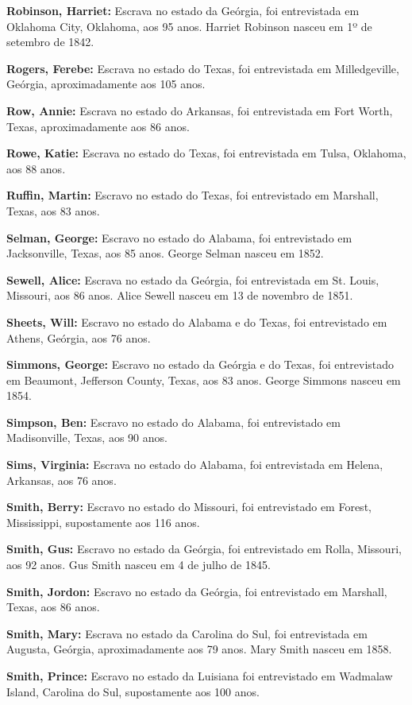 \textbf{Robinson, Harriet:} Escrava no estado da Geórgia, foi
entrevistada em Oklahoma City, Oklahoma, aos 95 anos. Harriet Robinson
nasceu em 1º de setembro de 1842.

\textbf{Rogers, Ferebe:} Escrava no estado do Texas, foi entrevistada em
Milledgeville, Geórgia, aproximadamente aos 105 anos.

\textbf{Row, Annie:} Escrava no estado do Arkansas, foi entrevistada em
Fort Worth, Texas, aproximadamente aos 86 anos.

\textbf{Rowe, Katie:} Escrava no estado do Texas, foi entrevistada em
Tulsa, Oklahoma, aos 88 anos.

\textbf{Ruffin, Martin:} Escravo no estado do Texas, foi entrevistado em
Marshall, Texas, aos 83 anos.

\textbf{Selman, George:} Escravo no estado do Alabama, foi entrevistado
em Jacksonville, Texas, aos 85 anos. George Selman nasceu em 1852.

\textbf{Sewell, Alice:} Escrava no estado da Geórgia, foi entrevistada
em St. Louis, Missouri, aos 86 anos. Alice Sewell nasceu em 13 de
novembro de 1851.

\textbf{Sheets, Will:} Escravo no estado do Alabama e do Texas, foi
entrevistado em Athens, Geórgia, aos 76 anos.

\textbf{Simmons, George:} Escravo no estado da Geórgia e do Texas, foi
entrevistado em Beaumont, Jefferson County, Texas, aos 83 anos. George
Simmons nasceu em 1854.

\textbf{Simpson, Ben:} Escravo no estado do Alabama, foi entrevistado em
Madisonville, Texas, aos 90 anos.

\textbf{Sims, Virginia:} Escrava no estado do Alabama, foi entrevistada
em Helena, Arkansas, aos 76 anos.

\textbf{Smith, Berry:} Escravo no estado do Missouri, foi entrevistado
em Forest, Mississippi, supostamente aos 116 anos.

\textbf{Smith, Gus:} Escravo no estado da Geórgia, foi entrevistado em
Rolla, Missouri, aos 92 anos. Gus Smith nasceu em 4 de julho de 1845.

\textbf{Smith, Jordon:} Escravo no estado da Geórgia, foi entrevistado
em Marshall, Texas, aos 86 anos.

\textbf{Smith, Mary:} Escrava no estado da Carolina do Sul, foi
entrevistada em Augusta, Geórgia, aproximadamente aos 79 anos. Mary
Smith nasceu em 1858.

\textbf{Smith, Prince:} Escravo no estado da Luisiana foi entrevistado
em Wadmalaw Island, Carolina do Sul, supostamente aos 100 anos.


